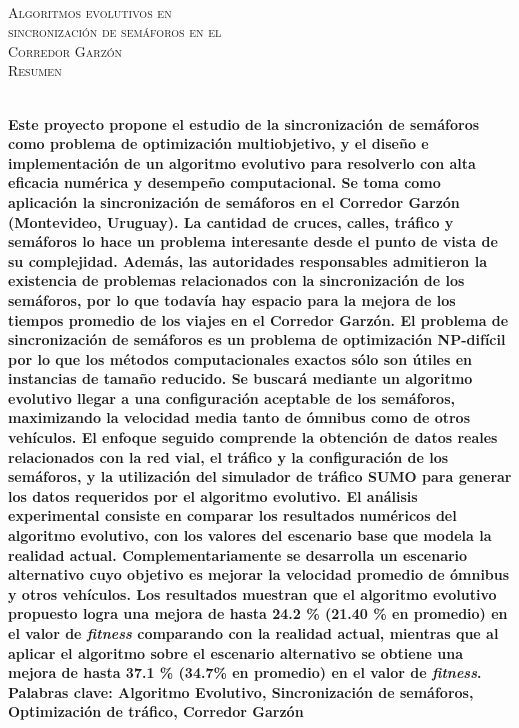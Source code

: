 {
\thispagestyle{empty}
~\\[0.2cm]
\begin{center}
    \textsc{\huge Algoritmos evolutivos en  } \\[0.2cm] 
    \textsc{\huge sincronización de semáforos en el  } \\[0.2cm]         
    \textsc{\huge Corredor Garzón} \\[1cm]
    \textsc{\Large Resumen}
\end{center}
~\\[0.2cm]
\textbf{\large 
Este proyecto propone el estudio de la sincronización de semáforos como problema de optimización multiobjetivo, y el diseño e implementación de un algoritmo evolutivo para resolverlo con alta eficacia numérica y desempeño computacional. Se toma como aplicación la sincronización de semáforos en el Corredor Garzón  (Montevideo, Uruguay). La cantidad de cruces, calles, tráfico y semáforos lo hace un problema interesante desde el punto de vista de su complejidad. Además, las autoridades responsables admitieron la existencia de problemas relacionados con la sincronización de los semáforos, por lo que todavía hay espacio para la mejora de los tiempos promedio de los viajes en el Corredor Garzón.  \newline \newline
El problema de sincronización de semáforos es un problema de optimización NP-difícil por lo que los métodos computacionales exactos sólo son útiles en instancias de tamaño reducido. Se buscará mediante un algoritmo evolutivo llegar a una configuración aceptable de los semáforos, maximizando la velocidad media tanto de ómnibus como de otros vehículos.
El enfoque seguido comprende la obtención de datos reales relacionados con la red vial, el tráfico y la configuración de los semáforos, y la utilización del simulador de tráfico SUMO para generar los datos requeridos por el algoritmo evolutivo.
\newline \newline
El análisis experimental consiste en comparar los resultados numéricos del algoritmo evolutivo, con los valores del escenario base que modela la realidad actual. Complementariamente se desarrolla un escenario alternativo cuyo objetivo es mejorar la velocidad promedio de ómnibus y otros vehículos. Los resultados muestran que el algoritmo evolutivo propuesto logra una mejora de hasta 24.2 \% (21.40 \% en promedio) en el valor de \emph{fitness} comparando con la realidad actual, mientras que al aplicar el algoritmo sobre el escenario alternativo se obtiene una mejora de hasta 37.1 \% (34.7\% en promedio) en el valor de \emph{fitness}.
 } 	
	~\\[1.0cm]
    \textbf{\large Palabras clave: Algoritmo Evolutivo, Sincronización de semáforos, Optimización de tráfico, Corredor Garzón}

}
\cleardoublepage
